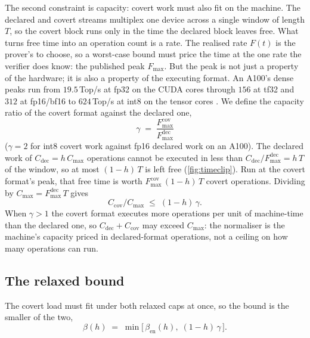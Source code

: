 \documentclass{article}
\theoremstyle{plain}
\theoremstyle{definition}
\theoremstyle{remark}
\begin{document}
The second constraint is capacity: covert work must also fit on the
machine. The declared and covert streams multiplex one device across a single window of
length $T$, so the covert block runs only in the time the declared block
leaves free. What turns free time into an operation count is a rate. The realised rate
$F(t)$ is the prover's to choose, so a worst-case bound must price the time
at the one rate the verifier does know: the published peak $F_{\max}$. But
the peak is not just a property of the hardware; it is also a property of
the executing format. An A100's dense peaks run from
$19.5$\,Top/s at fp32 on the CUDA cores through $156$ at tf32 and $312$ at
fp16/bf16 to $624$\,Top/s at int8 on the tensor cores \citep{nvidia2020a100}.
We define the capacity ratio of the covert format against the declared one,
\begin{equation}
	\gamma \;=\; \frac{F_{\max}^{\mathrm{cov}}}{F_{\max}^{\mathrm{dec}}}
	\label{eq:capratio}
\end{equation}
($\gamma = 2$ for int8 covert work against fp16 declared work on an A100). The declared work of $C_{\mathrm{dec}} = h\,C_{\max}$ operations cannot be executed
in less than $C_{\mathrm{dec}}/F_{\max}^{\mathrm{dec}} = h\,T$ of the window,
so at most $(1-h)\,T$ is left free (\cref{fig:timeclip}).
Run at the covert format's peak, that free
time is worth $F_{\max}^{\mathrm{cov}}\,(1-h)\,T$ covert operations. Dividing by
$C_{\max} = F_{\max}^{\mathrm{dec}}\,T$ gives
\begin{equation}
	C_{\mathrm{cov}}/C_{\max} \;\le\; (1-h)\,\gamma .
	\label{eq:capclip}
\end{equation}
When $\gamma > 1$ the covert format executes more operations per unit of
machine-time than the declared one, so $C_{\mathrm{dec}} + C_{\mathrm{cov}}$
may exceed $C_{\max}$: the normaliser is the machine's capacity priced in
declared-format operations, not a ceiling on how many operations can
run.

\subsection{The relaxed bound}
\label{subsec:betafloor}

The covert load must fit under both relaxed caps at once, so the bound is the
smaller of the two,
\begin{equation}
	\;\beta(h) \;=\;
	\min\bigl[\,\beta_{\mathrm{en}}(h),\; (1-h)\,\gamma\,\bigr].\;
	\label{eq:betafloor}
\end{equation}
\end{document}
